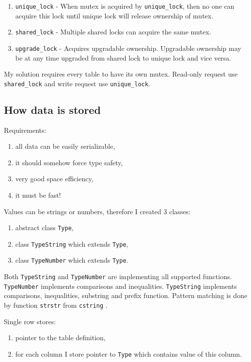 \documentclass[10pt,a4paper]{article}
\begin{document}
\begin{enumerate}
\item \verb|unique_lock| - When mutex is acquired by \verb|unique_lock|, then no one can acquire this lock until unique lock will release ownership of mutex. 
\item \verb|shared_lock| - Multiple shared locks can acquire the same mutex.
\item \verb|upgrade_lock| - Acquires upgradable ownership. Upgradable ownership may be at any time upgraded from shared lock to unique lock and vice versa.
\end{enumerate}

My solution requires every table to have its own mutex. Read-only request use \verb|shared_lock| and write request use \verb|unique_lock|.

\subsection{How data is stored}

Requirements:
\begin{enumerate}
\item all data can be easily serializable,
\item it should somehow force type safety,
\item very good space efficiency,
\item it must be fast!
\end{enumerate}
Values can be strings or numbers, therefore I created 3 classes:
\begin{enumerate}
\item abstract class \verb|Type|,
\item class \verb|TypeString| which extends \verb|Type|,
\item class \verb|TypeNumber| which extends \verb|Type|.
\end{enumerate}

Both \verb|TypeString| and \verb|TypeNumber| are implementing all supported functions. \verb|TypeNumber| implements comparisons and inequalities. \verb|TypeString| implements comparisons, inequalities, substring and prefix function. Pattern matching is done by function \verb|strstr| from \verb|cstring| \cite{STRSTR}.
\bigskip

Single row stores:
\begin{enumerate}
\item pointer to the table definition,
\item for each column I store pointer to \verb|Type| which contains value of this column.
\end{enumerate}
\end{document}
